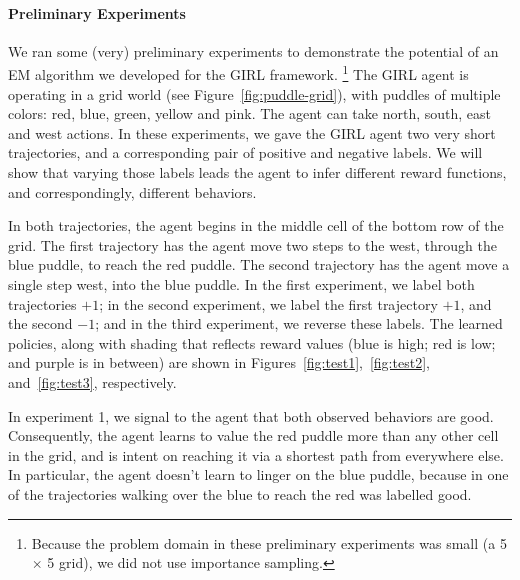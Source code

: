 
\vspace{\up}
\paragraph{Preliminary Experiments}

We ran some (very) preliminary experiments to demonstrate the
potential of an EM algorithm we developed for the GIRL framework.%
\footnote{Because the problem domain in these preliminary experiments
was small (a 5 $\times$ 5 grid), we did not use importance sampling.}
%
The GIRL agent is operating in a grid world (see
Figure~\ref{fig:puddle-grid}), with puddles of multiple colors: red,
blue, green, yellow and pink.  The agent can take north, south, east
and west actions.
In these experiments, we gave the GIRL agent two very short
trajectories, and a corresponding pair of positive and negative
labels.  We will show that varying those labels leads the agent to
infer different reward functions, and correspondingly, different
behaviors.

In both trajectories, the agent begins in the middle cell of the
bottom row of the grid.  The first trajectory has the agent move two
steps to the west, through the blue puddle, to reach the red puddle.
The second trajectory has the agent move a single step west, into the
blue puddle.
%
%
In the first experiment, we label both trajectories $+1$; in the
second experiment, we label the first trajectory $+1$, and the second
$-1$; and in the third experiment, we reverse these labels.  The
learned policies, along with shading that reflects reward values (blue
is high; red is low; and purple is in between)
are shown in Figures~\ref{fig:test1},~\ref{fig:test2},
and~\ref{fig:test3}, respectively.

In experiment 1, we signal to the agent that both observed behaviors
are good.  Consequently, the agent learns to value the red puddle more
than any other cell in the grid, and is intent on reaching it via a
shortest path from everywhere else.  In particular, the agent doesn't
learn to linger on the blue puddle, because in one of the trajectories
walking over the blue to reach the red was labelled good.

